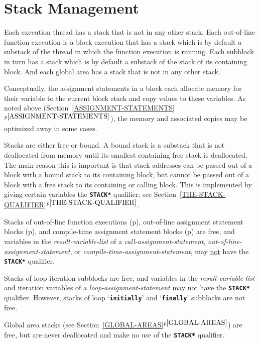 \documentclass[12pt]{article}
\newcommand{\TT}[1]{{\tt \bfseries #1}}
\newcommand{\itemref}[1]{\ref{#1}$^{p\pageref{#1}}$}
\newcommand{\pagref}[1]{p\pageref{#1}}
\begin{document}
\section{Stack Management}
\label{STACK-MANAGEMENT}

Each execution thread has a stack that is not in any other
stack.  Each out-of-line function
execution is a block execution that has a stack which is
by default a substack of the thread in which the function
execution is running.  Each subblock in turn has a stack
which is by default a substack of the stack of its containing block.
And each global area has a stack that is not in any other stack.

Conceptually, the assignment statements in a block each allocate memory for
their variable to the current block stack and copy values to these
variables.  As noted above (Section~\itemref{ASSIGNMENT-STATEMENTS}),
the memory and associated copies may be
optimized away in some cases.

Stacks are either free or bound.\label{FREE-STACK}
A bound stack is a substack that is
not deallocated from memory until its smallest containing free stack is
deallocated.  The main reason this is important is that stack addresses
can be passed out of a block with a bound stack to its containing block,
but cannot be passed out of a block with a free stack to its containing
or calling block.  This is implemented by giving certain
variables the \TT{*STACK*} qualifier: see
Section~\itemref{THE-STACK-QUALIFIER}.

Stacks of out-of-line function executions
(\pagref{OUT-OF-LINE-FUNCTIONS}),
out-of-line assignment statement blocks
(\pagref{OUT-OF-LINE-ASSIGNMENT-STATEMENTS}),
and
compile-time assignment statement blocks
(\pagref{COMPILE-TIME-ASSIGNMENT-STATEMENTS})
are free, and variables in the {\em result-variable-list}
of a {\em call-assignment-statement},
{\em out-of-line-assignment-statement}, or
{\em compile-time-assignment-statement},
may \underline{not} have the \TT{*STACK*} qualifier.

Stacks of loop iteration subblocks are free, and
variables in the {\em result-variable-list}
and iteration variables
of a {\em loop-assignment-statement} may not have the \TT{*STACK*}
qualifier.  However, stacks of loop `\TT{initially}' and `\TT{finally}'
subblocks are not free.

Global area stacks (see Section~\itemref{GLOBAL-AREAS}) are free,
but are never deallocated and make no use of the \TT{*STACK*}
qualifier.
\end{document}
